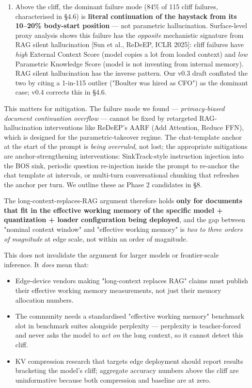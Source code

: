 \documentclass[11pt]{article}
\begin{document}
\begin{enumerate}
\item Above the cliff, the dominant failure mode (84\% of 115 cliff failures, characterised in §4.6) is \textbf{literal continuation of the haystack from its 10–20\% body-start position} — not parametric hallucination. Surface-level proxy analysis shows this failure has the \textit{opposite} mechanistic signature from RAG silent hallucination [Sun et al., ReDeEP, ICLR 2025]: cliff failures have \textit{high} External Context Score (model copies a lot from loaded context) and \textit{low} Parametric Knowledge Score (model is not inventing from internal memory). RAG silent hallucination has the inverse pattern. Our v0.3 draft conflated the two by citing a 1-in-115 outlier ("Boulter was hired as CFO") as the dominant case; v0.4 corrects this in §4.6.
\end{enumerate}


This matters for mitigation. The failure mode we found — \textit{primacy-biased document continuation overflow} — cannot be fixed by retargeted RAG-hallucination interventions like ReDeEP's AARF (Add Attention, Reduce FFN), which is designed for the parametric-takeover regime. The chat-template anchor at the start of the prompt is \textit{being overruled}, not lost; the appropriate mitigations are anchor-strengthening interventions: SinkTrack-style instruction injection into the BOS sink, periodic question re-injection inside the prompt to re-anchor the chat template at intervals, or multi-turn conversational chunking that refreshes the anchor per turn. We outline these as Phase 2 candidates in §8.


The long-context-replaces-RAG argument therefore holds \textbf{only for documents that fit in the effective working memory of the specific model + quantization + loader configuration being deployed}, and the gap between "nominal context window" and "effective working memory" is \textit{two to three orders of magnitude} at edge scale, not within an order of magnitude.


This does not invalidate the argument for larger models or frontier-scale inference. It \textit{does} mean that:

\begin{itemize}
\item Edge-device vendors making "long-context replaces RAG" claims must publish their effective working memory measurements, not just their memory allocation numbers.
\item The community needs a standardised "effective working memory" benchmark slot in benchmark suites alongside perplexity — perplexity is teacher-forced and never asks the model to \textit{act on} the long context, so it cannot detect this cliff.
\item KV compression research that targets edge deployment should report results bracketing the model's cliff; aggregate accuracy numbers above the cliff are uninformative because both compression and baseline are at zero.
\end{itemize}
\end{document}
